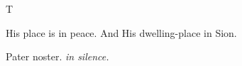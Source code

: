 ﻿%
\bigskip\bigskip{}
\def\matinsnocturn{3rd Nocturn}
%
\large
\def\preant{\setgrefactor{17}\large}
\def\prepsalm{\normalsize}
\def\anttranslation{God is my helper, and the Lord is the protector of my soul.}
\def\psalmtranslationsmall{T}
\let\prepsalm=\undefined
%
\printseparation
{
\def\preant{\setgrefactor{17}\large}
\def\prepsalm{\normalsize}
\def\psalmtranslationsmall{T}
\def\anttranslation{His place is in peace and His dwelling-place in Zion.}
\def\lalinebreakafterthree\undefined{T}
\let\prepsalm=\undefined
}
%
\printseparation{}
\vspace{-3pt}
{
\def\preant{\setgrefactor{17}\large}
\def\psalmtranslationsmall{T}
\def\anttranslation{I am become as a man without help, free among the dead.}
\def\lalinebreakafterseven{T}
\def\prepsalmverses{\vspace{-9pt}}
}

\bigskip\bigskip
{}
{His place is in peace.}
{And His dwelling-place in Sion.}

\bigskip
Pater noster. \emph{in silence.}

